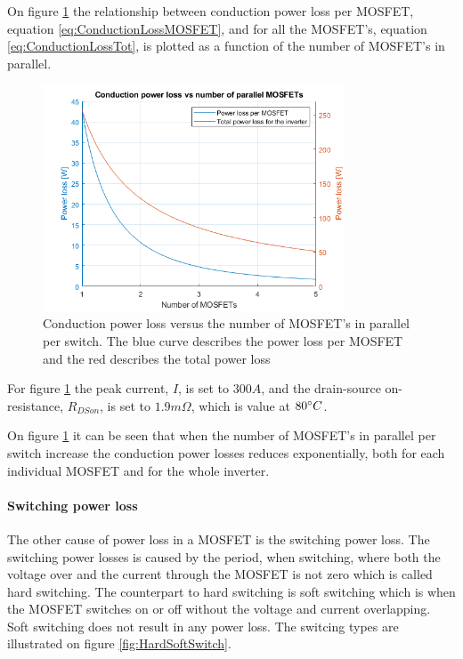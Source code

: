 On figure \ref{fig:ConductionLoss} the relationship between conduction power loss per MOSFET, equation \ref{eq:ConductionLossMOSFET}, and for all the MOSFET's, equation \ref{eq:ConductionLossTot}, is plotted as a function of the number of MOSFET's in parallel. 

    \begin{figure}[H]
		\centering
		\includegraphics[width=0.8\textwidth]{pictures/hardware/Power_Board/Conduction_loss.png}
		\caption{Conduction power loss versus the number of MOSFET's in parallel per switch. The blue curve describes the power loss per MOSFET and the red describes the total power loss}
		\label{fig:ConductionLoss}
	\end{figure} 

For figure \ref{fig:ConductionLoss} the peak current, $I$, is set to $300 A$, and the drain-source on-resistance, $R_{DSon}$, is set to ${1.9 m \Omega}$, which is value at $80 \degree C$. \cite{mosfet}

On figure \ref{fig:ConductionLoss} it can be seen that when the number of MOSFET's in parallel per switch increase the conduction power losses reduces exponentially, both for each individual MOSFET and for the whole inverter.

\paragraph{Switching power loss}
\label{sec:switching_power_loss}
The other cause of power loss in a MOSFET is the switching power loss. The switching power losses is caused by the period, when switching, where both the voltage over and the current through the MOSFET is not zero which is called hard switching. The counterpart to hard switching is soft switching which is when the MOSFET switches on or off without the voltage and current overlapping. Soft switching does not result in any power loss. The switcing types are illustrated on figure \ref{fig:HardSoftSwitch}.

